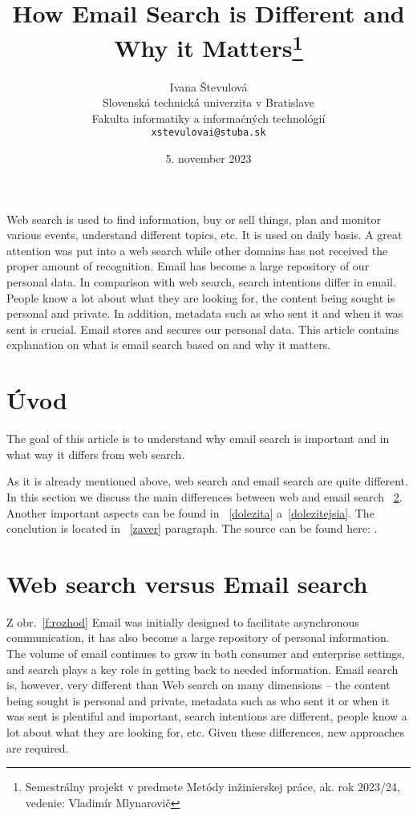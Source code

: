 \documentclass[10pt,twoside,slovak,a4paper]{article}
\title{ How Email Search is Different and Why it Matters\thanks{Semestrálny projekt v predmete Metódy inžinierskej práce, ak. rok 2023/24, vedenie: Vladimír Mlynarovič}} %
\author{Ivana Števulová\\[2pt]
	{\small Slovenská technická univerzita v Bratislave}\\
	{\small Fakulta informatiky a informačných technológií}\\
	{\small \texttt{xstevulovai@stuba.sk}}
	}
\date{\small 5. november 2023}%
\begin{document}
\maketitle

\begin{abstract}

\end{abstract}

Web search is used to find information, buy or sell things, plan and monitor various events, understand different topics, etc. It is used on daily basis. A great attention was put into a web search while other domains has not received the proper amount of recognition. Email has become a large repository of our personal data. In comparison with web search, search intentions differ in email. People know a lot about what they are looking for, the content being sought is personal and private. In addition, metadata such as who sent it and when it was sent is crucial. Email stores and secures our personal data. This article contains explanation on what is email search based on and why it matters. 


\section{Úvod}

The goal of this article is to understand why email search is important and in what way it differs from web search.

As it is already mentioned above, web search and email search are quite different. In this section we discuss the main differences between web and email search ~\ref{web vs email}.
Another important aspects can be found in ~\ref{dolezita} a~\ref{dolezitejsia}.
The conclution is located in ~\ref{zaver} paragraph.
The source can be found here: \cite{DBLP:conf/wsdm/Dumais21}.



\section{Web search versus Email search} \label{web vs email}

Z obr.~\ref{f:rozhod} 
Email was initially designed to facilitate asynchronous communication, it has also become a large repository of personal information. The volume of email continues to grow in both consumer and enterprise settings, and search plays a key role in getting back to needed information. Email search is, however, very different than Web search on many dimensions -- the content being sought is personal and private, metadata such as who sent it or when it was sent is plentiful and important, search intentions are different, people know a lot about what they are looking for, etc. Given these differences, new approaches are required.
\end{document}
